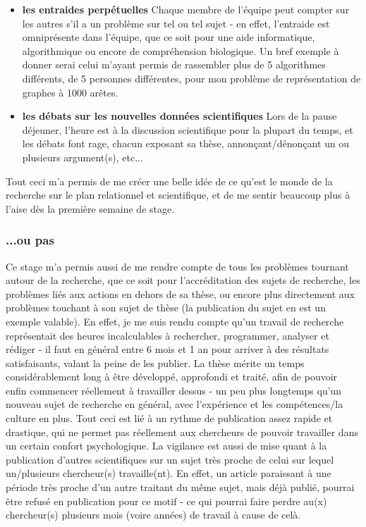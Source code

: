 \documentclass{report}
\begin{document}
\begin{itemize}
\item \textbf{les entraides perpétuelles}
	\newline
	Chaque membre de l'équipe peut compter sur les autres s'il a un problème sur tel ou tel sujet - en effet, l'entraide est omniprésente dans l'équipe, que ce soit pour une aide informatique, algorithmique ou encore de compréhension biologique. Un bref exemple à donner serai celui m'ayant permis de rassembler plus de 5 algorithmes différents, de 5 personnes différentes, pour mon problème de représentation de graphes à 1000 arêtes.
\item \textbf{les débats sur les nouvelles données scientifiques}
	\newline
	Lors de la pause déjeuner, l'heure est à la discussion scientifique pour la plupart du temps, et les débats font rage, chacun exposant sa thèse, annonçant/dénonçant un ou plusieurs argument(s), etc...
\end{itemize}
Tout ceci m'a permis de me créer une belle idée de ce qu'est le monde de la recherche sur le plan relationnel et scientifique, et de me sentir beaucoup plus à l'aise dès la première semaine de stage.

\subsubsection{...ou pas}

Ce stage m'a permis aussi de me rendre compte de tous les problèmes tournant autour de la recherche, que ce soit pour l'accréditation des sujets de recherche, les problèmes liés aux actions en dehors de sa thèse, ou encore plus directement aux problèmes touchant à son sujet de thèse (la publication du sujet en est un exemple valable).
\newline
En effet, je me suis rendu compte qu'un travail de recherche représentait des heures incalculables à rechercher, programmer, analyser et rédiger - il faut en général entre 6 mois et 1 an pour arriver à des résultats satisfaisants, valant la peine de les publier.
\newline
La thèse mérite un temps considérablement long à être développé, approfondi et traité, afin de pouvoir enfin commencer réellement à travailler dessus - un peu plus longtemps qu'un nouveau sujet de recherche en général, avec l'expérience et les compétences/la culture en plus.
\newline
Tout ceci est lié à un rythme de publication assez rapide et drastique, qui ne permet pas réellement aux chercheurs de pouvoir travailler dans un certain confort psychologique.
\newline
La vigilance est aussi de mise quant à la publication d'autres scientifiques sur un sujet très proche de celui sur lequel un/plusieurs chercheur(s) travaille(nt). En effet, un article paraissant à une période très proche d'un autre traitant du même sujet, mais déjà publié, pourrai être refusé en publication pour ce motif - ce qui pourrai faire perdre au(x) chercheur(s) plusieurs mois (voire années) de travail à cause de celà.
\end{document}
